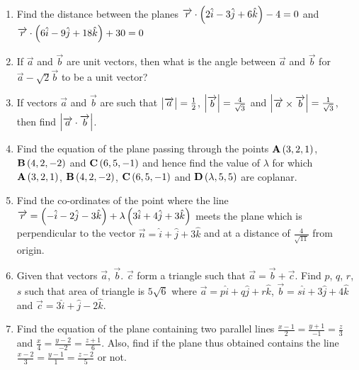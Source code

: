 \begin{enumerate}
	\item Find the distance between the planes $\overrightarrow{r} \cdot \left(2\hat{i} - 3\hat{j} + 6\hat{k}\right) - 4 = 0$ and $\overrightarrow{r} \cdot \left(6\hat{i} - 9\hat{j} + 18\hat{k}\right) + 30 = 0$
	\item If $\overrightarrow{a}$ and $\overrightarrow{b}$ are unit vectors, then what is the angle between $\overrightarrow{a}$ and $\overrightarrow{b}$ for $\overrightarrow{a} - \sqrt{2}\overrightarrow{b}$ to be a unit vector?
	\item If vectors $\overrightarrow{a}$ and $\overrightarrow{b}$ are such that $\begin{vmatrix}\overrightarrow{a}\end{vmatrix} = \frac{1}{2}$, $\begin{vmatrix}\overrightarrow{b}\end{vmatrix} = \frac{4}{\sqrt{3}}$ and $\begin{vmatrix}\overrightarrow{a}\times \overrightarrow{b}\end{vmatrix} = \frac{1}{\sqrt{3}}$, then find $\begin{vmatrix}\overrightarrow{a} \cdot \overrightarrow{b}\end{vmatrix}$.
	\item Find the equation of the plane passing through the points $\mathbf{A} \left(3, 2, 1\right)$, $\mathbf{B} \left(4, 2, -2\right)$ and $\mathbf{C} \left(6, 5, -1\right)$ and hence find the value of $\lambda$ for which $\mathbf{A} \left(3, 2, 1\right)$, $\mathbf{B}\left(4, 2, -2\right)$, $\mathbf{C}\left(6, 5, -1\right)$ and $\mathbf{D}\left(\lambda, 5, 5\right)$ are coplanar.
	\item Find the co-ordinates of the point where the line $\overrightarrow{r} = \left(-\hat{i}-2\hat{j}-3\hat{k}\right) + \lambda \left(3\hat{i}+4\hat{j}+3\hat{k}\right)$ meets the plane which is perpendicular to the vector $\overrightarrow{n} = \hat{i} + \hat{j} + 3\hat{k}$ and at a distance of $\frac{4}{\sqrt{11}}$ from origin. 
	\item Given that vectors $\overrightarrow{a}$, $\overrightarrow{b}$. $\overrightarrow{c}$ form a triangle such that $\overrightarrow{a} = \overrightarrow{b} + \overrightarrow{c}$. Find $p$, $q$, $r$, $s$ such that area of triangle is $5\sqrt{6}$ where $\overrightarrow{a} = p\hat{i} + q\hat{j} + r\hat{k}$, $\overrightarrow{b} = s\hat{i} + 3\hat{j} + 4\hat{k}$ and $\overrightarrow{c} = 3\hat{i} + \hat{j} - 2\hat{k}$.
	\item Find the equation of the plane containing two parallel lines $\frac{x-1}{2} = \frac{y+1}{-1} = \frac{z}{3}$ and $\frac{x}{4} = \frac{y-2}{-2} = \frac{z+1}{6}$. Also, find if the plane thus obtained contains the line $\frac{x - 2}{3} = \frac{y - 1}{1} = \frac{z-2}{5}$ or not.
\end{enumerate}
